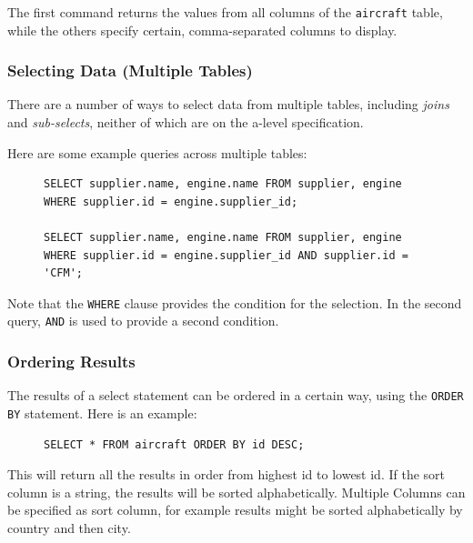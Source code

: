 \documentclass[9pt]{article}
\begin{document}
The first command returns the values from all columns of the \texttt{aircraft} table, while the others specify certain, comma-separated columns to display.

\subsubsection{Selecting Data (Multiple Tables)}
\label{sec:org2085dec}

There are a number of ways to select data from multiple tables, including \emph{joins} and \emph{sub-selects}, neither of which are on the a-level specification.

Here are some example queries across multiple tables:

\begin{figure}[H]
\begin{verbatim}
SELECT supplier.name, engine.name FROM supplier, engine WHERE supplier.id = engine.supplier_id;

SELECT supplier.name, engine.name FROM supplier, engine WHERE supplier.id = engine.supplier_id AND supplier.id = 'CFM';
\end{verbatim}
\end{figure}

Note that the \texttt{WHERE} clause provides the condition for the selection. In the second query, \texttt{AND} is used to provide a second condition.

\subsubsection{Ordering Results}
\label{sec:orgecf54f3}

The results of a select statement can be ordered in a certain way, using the \texttt{ORDER BY} statement. Here is an example:

\begin{figure}[H]
\begin{verbatim}
SELECT * FROM aircraft ORDER BY id DESC;
\end{verbatim}
\end{figure}

This will return all the results in order from highest id to lowest id. If the sort column is a string, the results will be sorted alphabetically. Multiple Columns can be specified as sort column, for example results might be sorted alphabetically by country and then city.
\end{document}
